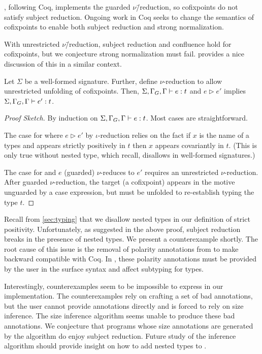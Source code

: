 \lang, following Coq, implements the guarded $\nu$\=/reduction, so cofixpoints do not satisfy subject reduction.
Ongoing work in Coq seeks to change the semantics of cofixpoints to enable both subject reduction and strong normalization.

With unrestricted $\nu$\=/reduction, subject reduction and confluence hold for cofixpoints, but we conjecture strong normalization must fail.
\citet{cc-hat-omega} provides a nice discussion of this in a similar context.

\begin{theorem}
  \label{thm:metatheory:sr}
  Let $\Sigma$ be a well-formed signature.
  Further, define $\nu$-reduction to allow unrestricted unfolding
  of cofixpoints.
  Then, $\Sigma, \Gamma_G, \Gamma \vdash e : t$ and $e \rhd e'$ implies
  $\Sigma, \Gamma_G, \Gamma \vdash e' : t$.
\end{theorem}
%
\begin{proof}[Proof Sketch]
  By induction on $\Sigma, \Gamma_G, \Gamma \vdash e : t$. Most cases are straightforward.

  The case for  where $e \rhd e'$ by $\iota$-reduction relies on the fact
  if $x$ is the name of a \coinductive types and appears strictly positively in
  $t$ then $x$ appears covariantly in $t$.
  (This is only true without nested \coinductive type, which recall, \lang disallows in well-formed signatures.)

  The case for  and $e$ (guarded) $\nu$-reduces to $e'$ requires an unrestricted $\nu$-reduction.
  After guarded $\nu$-reduction, the target (a cofixpoint) appears in the motive unguarded by a case expression, but must be unfolded to re-establish typing the type $t$.
\end{proof}

Recall from \autoref{sec:typing} that we disallow nested \coinductive types in our definition of strict positivity.
Unfortunately, as suggested in the above proof, subject reduction breaks in the presence of nested \coinductive types.
We present a counterexample shortly.
The root cause of this issue is the removal of polarity annotations from \CIChat to make \lang backward compatible with Coq.
In \CIChat, these polarity annotations must be provided by the user in the surface syntax and affect subtyping for \coinductive types.

Interestingly, counterexamples seem to be impossible to express in our implementation.
The counterexamples rely on crafting a set of bad annotations, but the user cannot provide annotations directly and is forced to rely on size inference.
The size inference algorithm seems unable to produce these bad annotations.
We conjecture that \lang programs whose size annotations are generated by the algorithm do enjoy subject reduction.
Future study of the inference algorithm should provide insight on how to add nested \coinductive types to \lang.

